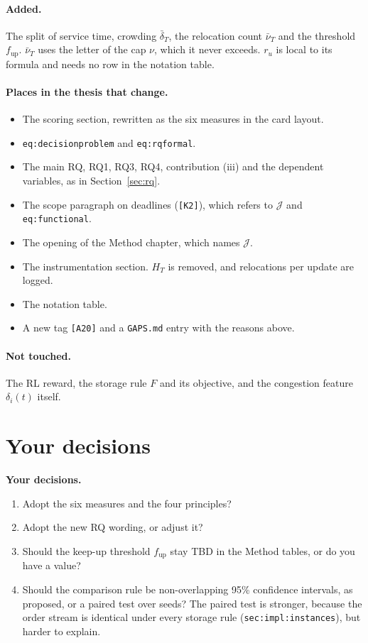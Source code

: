 \documentclass[11pt,a4paper]{article}
\newcommand{\ask}[1]{\par\smallskip\noindent\colorbox{askbg}{\parbox{\dimexpr\linewidth-2\fboxsep}{\textbf{Your decisions.} #1}}\par\smallskip}
\begin{document}
\paragraph{Added.} The split of service time, crowding $\bar\delta_T$,
the relocation count $\bar\nu_T$ and the threshold $f_{\mathrm{up}}$.
$\bar\nu_T$ uses the letter of the cap $\nu$, which it never exceeds.
$r_u$ is local to its formula and needs no row in the notation table.

\paragraph{Places in the thesis that change.}
\begin{itemize}[nosep]
  \item The scoring section, rewritten as the six measures in the card
    layout.
  \item \texttt{eq:decisionproblem} and \texttt{eq:rqformal}.
  \item The main RQ, RQ1, RQ3, RQ4, contribution (iii) and the dependent
    variables, as in Section~\ref{sec:rq}.
  \item The scope paragraph on deadlines (\texttt{[K2]}), which refers to
    $\mathcal{J}$ and \texttt{eq:functional}.
  \item The opening of the Method chapter, which names $\mathcal{J}$.
  \item The instrumentation section. $H_T$ is removed, and relocations per
    update are logged.
  \item The notation table.
  \item A new tag \texttt{[A20]} and a \texttt{GAPS.md} entry with the
    reasons above.
\end{itemize}

\paragraph{Not touched.} The RL reward, the storage rule $F$ and its
objective, and the congestion feature $\delta_i(t)$ itself.

\section{Your decisions}

\ask{\begin{enumerate}[nosep,leftmargin=1.2em]
  \item Adopt the six measures and the four principles?
  \item Adopt the new RQ wording, or adjust it?
  \item Should the keep-up threshold $f_{\mathrm{up}}$ stay TBD in the
    Method tables, or do you have a value?
  \item Should the comparison rule be non-overlapping 95\% confidence
    intervals, as proposed, or a paired test over seeds? The paired test is
    stronger, because the order stream is identical under every storage
    rule (\texttt{sec:impl:instances}), but harder to explain.
\end{enumerate}}
\end{document}
